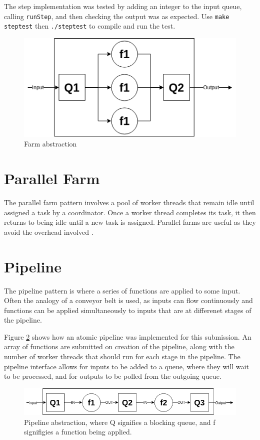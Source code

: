 \documentclass[12pt]{article}
\def\code#1{\texttt{#1}}
\begin{document}
The step implementation was tested by adding an integer to the input queue, calling \code{runStep}, and then checking the output was as expected. Use \code{make steptest} then \code{./steptest} to compile and run the test.

\begin{figure}[!ht]
	\centering 
	\includegraphics[width=0.8\linewidth]{images/farm}
	\caption{Farm abstraction}
	\label{fig:farm}
\end{figure}


\section{Parallel Farm}

The parallel farm pattern involves a pool of worker threads that remain idle until assigned a task by a coordinator. Once a worker thread completes its task, it then returns to being idle until a new task is assigned. Parallel farms are useful as they avoid the overhead involved .


\section{Pipeline} 

The pipeline pattern is where a series of functions are applied to some input. Often the analogy of a conveyor belt is used, as inputs can flow continuously and functions can be applied simultaneously to inputs that are at differenet stages of the pipeline.

Figure \ref{fig:pipe} shows how an atomic pipeline was implemented for this submission. An array of functions are submitted on creation of the pipeline, along with the number of worker threads that should run for each stage in the pipeline. The pipeline interface allows for inputs to be added to a queue, where they will wait to be processed, and for outputs to be polled from the outgoing queue. 

\begin{figure}[!ht]
	\centering 
	\includegraphics[width=\linewidth]{images/pipe}
	\caption{Pipeline abstraction, where Q signifies a blocking queue, and f signifigies a function being applied.}
	\label{fig:pipe}
\end{figure}
\end{document}

